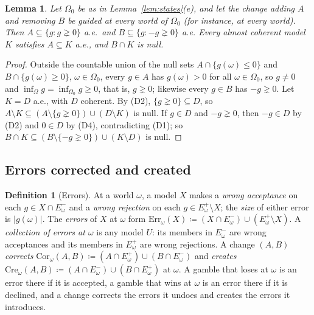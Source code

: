 \documentclass[11pt]{article}
\newtheorem{lemma}[theorem]{Lemma}
\theoremstyle{definition}
\newtheorem{definition}[theorem]{Definition}
\newcommand{\Err}{\mathrm{Err}}
\newcommand{\Cor}{\mathrm{Cor}}
\newcommand{\Cre}{\mathrm{Cre}}
\newcommand{\Ep}{E^{+}}
\newcommand{\Em}{E^{-}}
\begin{document}
\begin{lemma}\label{lem:guided}
{\color{red}Let $\Omega_0$ be as in Lemma~\ref{lem:states}(e), and let the change adding $A$ and removing $B$ be guided at every world of $\Omega_0$ (for instance, at every world).} Then $A\subseteq\{g:g\gneq0\}$ a.e.\ and $B\subseteq\{g:-g\gneq0\}$ a.e. Every almost coherent model $K$ satisfies $A\subseteq K$ a.e., and $B\cap K$ is null.
\end{lemma}
\begin{proof}
Outside the countable union of the null sets $A\cap\{g(\omega)\le0\}$ and $B\cap\{g(\omega)\ge0\}$, $\omega\in\Omega_0$, every $g\in A$ has $g(\omega)>0$ for all $\omega\in\Omega_0$, so $g\ne0$ and $\inf_\Omega g=\inf_{\Omega_0}g\ge0$, that is, $g\gneq0$; likewise every $g\in B$ has $-g\gneq0$. Let $K=D$ a.e., with $D$ coherent. By (D2), $\{g\gneq0\}\subseteq D$, so $A\setminus K\subseteq(A\setminus\{g\gneq0\})\cup(D\setminus K)$ is null. If $g\in D$ and $-g\gneq0$, then $-g\in D$ by (D2) and $0\in D$ by (D4), contradicting (D1); so $B\cap K\subseteq(B\setminus\{-g\gneq0\})\cup(K\setminus D)$ is null.
\end{proof}

\begingroup\color{red}
\subsection{Errors corrected and created}

\begin{definition}[Errors]\label{def:errors}
At a world $\omega$, a model $X$ makes a \emph{wrong acceptance} on each $g\in X\cap\Em_\omega$ and a \emph{wrong rejection} on each $g\in\Ep_\omega\setminus X$; the \emph{size} of either error is $|g(\omega)|$. The \emph{errors} of $X$ at $\omega$ form $\Err_\omega(X)\coloneqq(X\cap\Em_\omega)\cup(\Ep_\omega\setminus X)$. A \emph{collection of errors at $\omega$} is any model $U$: its members in $\Em_\omega$ are wrong acceptances and its members in $\Ep_\omega$ are wrong rejections. A change $(A,B)$ \emph{corrects} $\Cor_\omega(A,B)\coloneqq(A\cap\Ep_\omega)\cup(B\cap\Em_\omega)$ and \emph{creates} $\Cre_\omega(A,B)\coloneqq(A\cap\Em_\omega)\cup(B\cap\Ep_\omega)$ at $\omega$. A gamble that loses at $\omega$ is an error there if it is accepted, a gamble that wins at $\omega$ is an error there if it is declined, and a change corrects the errors it undoes and creates the errors it introduces.
\end{definition}
\end{document}
